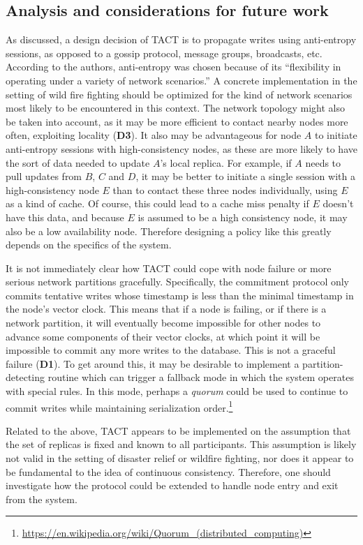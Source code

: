 \subsection{Analysis and considerations for future work}
As discussed, a design decision of TACT is to propagate writes using
anti-entropy sessions, as opposed to a gossip protocol, message
groups, broadcasts, etc. According to the authors, anti-entropy was
chosen because of its ``flexibility in operating under a variety of
network scenarios.''  \cite{2002tact} A concrete implementation in the
setting of wild fire fighting should be optimized for the kind of
network scenarios most likely to be encountered in this context. The
network topology might also be taken into account, as it may be more
efficient to contact nearby nodes more often, exploiting locality
(\textbf{D3}). It also may be advantageous for node $A$ to initiate
anti-entropy sessions with high-consistency nodes, as these are more
likely to have the sort of data needed to update $A$'s local
replica. For example, if $A$ needs to pull updates from $B$, $C$ and
$D$, it may be better to initiate a single session with a
high-consistency node $E$ than to contact these three nodes
individually, using $E$ as a kind of cache. Of course, this could lead
to a cache miss penalty if $E$ doesn't have this data, and because $E$
is assumed to be a high consistency node, it may also be a low
availability node. Therefore designing a policy like this greatly
depends on the specifics of the system.

It is not immediately clear how TACT could cope with node failure or
more serious network partitions gracefully. Specifically, the
commitment protocol only commits tentative writes whose timestamp is
less than the minimal timestamp in the node's vector clock. This means
that if a node is failing, or if there is a network partition, it will
eventually become impossible for other nodes to advance some
components of their vector clocks, at which point it will be
impossible to commit any more writes to the database. This is not a
graceful failure (\textbf{D1}). To get around this, it may be
desirable to implement a partition-detecting routine which can trigger
a fallback mode in which the system operates with special rules. In
this mode, perhaps a \emph{quorum} could be used to continue to commit
writes while maintaining serialization order.\footnote{
\url{https://en.wikipedia.org/wiki/Quorum_(distributed_computing)}}

Related to the above, TACT appears to be implemented on the assumption
that the set of replicas is fixed and known to all participants. This
assumption is likely not valid in the setting of disaster relief or
wildfire fighting, nor does it appear to be fundamental to the idea of
continuous consistency. Therefore, one should investigate how the
protocol could be extended to handle node entry and exit from the
system.

